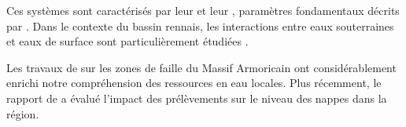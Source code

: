 \documentclass[12pt,a4paper]{report}
\begin{document}
Ces systèmes sont caractérisés par leur \permeability{} et leur \porosity{}, paramètres fondamentaux décrits par \textcite{Bear2018}. Dans le contexte du bassin rennais, les interactions entre eaux souterraines et eaux de surface sont particulièrement étudiées \parencite{Aquilina2012}.

Les travaux de \textcite{Roques2013} sur les zones de faille du Massif Armoricain ont considérablement enrichi notre compréhension des ressources en eau locales. Plus récemment, le rapport de \parencite{BRGM2020} a évalué l'impact des prélèvements sur le niveau des nappes dans la région.


\printbibliography[heading=bibliography, title=Références bibliographiques]
\end{document}
